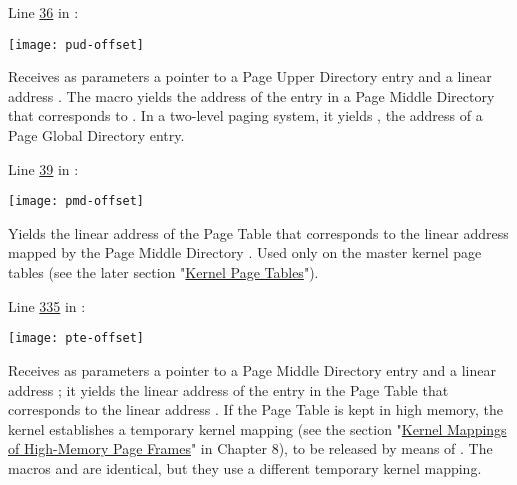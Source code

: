 \begin{description}
  Line \href{http://lxr.linux.no/linux+v2.6.11/include/asm-generic/pgtable-nopud.h#L36}{36} in
  :
  \begin{center}
    \texttt{[image: pud-offset]}
  \end{center}

\item[\code{pmd\_offset(pud, addr)}] Receives as parameters a pointer  to a Page
  Upper Directory entry and a linear address . The macro yields the address of the
  entry in a Page Middle Directory that corresponds to . In a two-level paging system,
  it yields , the address of a Page Global Directory entry.

  Line \href{http://lxr.linux.no/linux+v2.6.11/include/asm-generic/pgtable-nopmd.h#L39}{39} in
  :
  \begin{center}    
    \texttt{[image: pmd-offset]}
  \end{center}


\item[\code{pte\_offset\_kernel(dir, addr)}] Yields the linear address of the Page Table
  that corresponds to the linear address  mapped by the Page Middle Directory
  . Used only on the master kernel page tables (see the later section
  "\href{http://cs2.swfu.edu.cn/pub/resources/Books/Linux/kernel/OREILLY-Understanding_The_Linux_Kernel_3e/0596005652/understandlk-chp-2-sect-5.html#understandlk-chp-2-sect-5.5}{Kernel
    Page Tables}").

  Line \href{http://lxr.linux.no/linux+v2.6.11/include/asm-i386/pgtable.h#L335}{335} in
  :
  \begin{center}
    \texttt{[image: pte-offset]}
  \end{center}

\item[\code{pte\_offset\_map(dir, addr)}] Receives as parameters a pointer  to a
  Page Middle Directory entry and a linear address ; it yields the linear
  address of the entry in the Page Table that corresponds to the linear address
  . If the Page Table is kept in high memory, the kernel establishes a
  temporary kernel mapping (see the section
  "\href{http://cs2.swfu.edu.cn/pub/resources/Books/Linux/kernel/OREILLY-Understanding_The_Linux_Kernel_3e/0596005652/understandlk-chp-8-sect-1.html#understandlk-chp-8-sect-1.6}{Kernel
    Mappings of High-Memory Page Frames}" in Chapter 8), to be released by means of
  . The macros  and
   are identical, but they use a different temporary kernel
  mapping.


\end{description}
